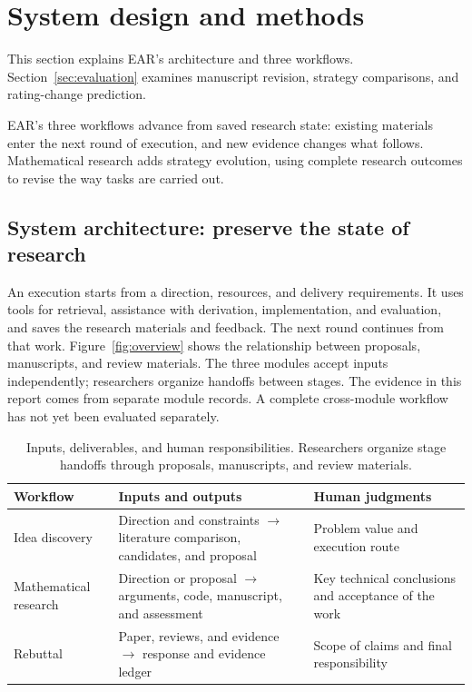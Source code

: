 \FloatBarrier
{}
\section{System design and methods}
\label{sec:methods}
This section explains EAR's architecture and three workflows. Section~\ref{sec:evaluation} examines manuscript revision, strategy comparisons, and rating-change prediction.

EAR's three workflows advance from saved research state: existing materials enter the next round of execution, and new evidence changes what follows. Mathematical research adds strategy evolution, using complete research outcomes to revise the way tasks are carried out.

\FloatBarrier
\subsection{System architecture: preserve the state of research}
\label{sec:architecture}
An execution starts from a direction, resources, and delivery requirements. It uses tools for retrieval, assistance with derivation, implementation, and evaluation, and saves the research materials and feedback. The next round continues from that work. Figure~\ref{fig:overview} shows the relationship between proposals, manuscripts, and review materials. The three modules accept inputs independently; researchers organize handoffs between stages. The evidence in this report comes from separate module records. A complete cross-module workflow has not yet been evaluated separately.


\begin{table}[H]
\centering\small
\begin{tabularx}{\textwidth}{P{28mm}Y Y}
\toprule
{}
\textbf{Workflow} & \textbf{Inputs and outputs} & \textbf{Human judgments}\\
\midrule
Idea discovery & Direction and constraints $\to$ literature comparison, candidates, and proposal & Problem value and execution route\\
Mathematical research & Direction or proposal $\to$ arguments, code, manuscript, and assessment & Key technical conclusions and acceptance of the work\\
Rebuttal & Paper, reviews, and evidence $\to$ response and evidence ledger & Scope of claims and final responsibility\\
\bottomrule
\end{tabularx}
\caption{Inputs, deliverables, and human responsibilities. Researchers organize stage handoffs through proposals, manuscripts, and review materials.}
\label{tab:interfaces}
\end{table}

